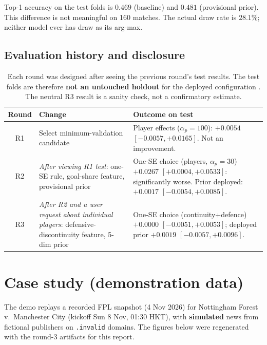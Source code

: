 \documentclass[11pt,a4paper]{article}
\newcommand{\code}[1]{\texttt{\small #1}}
\begin{document}
Top-1 accuracy on the test folds is $0.469$ (baseline) and $0.481$
(provisional prior). This difference is not meaningful on 160 matches. The
actual draw rate is $28.1\%$; neither model ever has draw as its arg-max.

\subsection{Evaluation history and disclosure}\label{sec:rounds}

\begin{table}[h]
\centering\small
\begin{tabularx}{\linewidth}{@{}c>{\raggedright\arraybackslash}p{5.6cm}>{\raggedright\arraybackslash}X@{}}
\toprule
Round & Change & Outcome on test \\
\midrule
R1 & Select minimum-validation candidate & Player effects ($\alpha_p{=}100$): $+0.0054$ $[-0.0057,+0.0165]$. Not an improvement. \\
R2 & \emph{After viewing R1 test}: one-SE rule, goal-share feature, provisional prior & One-SE choice (players, $\alpha_p{=}30$) $+0.0267$ $[+0.0004,+0.0533]$: significantly worse. Prior deployed: $+0.0017$ $[-0.0054,+0.0085]$. \\
R3 & \emph{After R2 and a user request about individual players}: defensive-discontinuity feature, 5-dim prior & One-SE choice (continuity+defence) $+0.0000$ $[-0.0051,+0.0053]$; deployed prior $+0.0019$ $[-0.0057,+0.0096]$. \\
\bottomrule
\end{tabularx}
\caption{Each round was designed after seeing the previous round's test
results. The test folds are therefore \textbf{not an untouched holdout} for the
deployed configuration \citep{cawley2010}. The neutral R3 result is a sanity
check, not a confirmatory estimate.}
\label{tab:rounds}
\end{table}

\section{Case study (demonstration data)}\label{sec:case}

The demo replays a recorded FPL snapshot (4 Nov 2026) for Nottingham Forest
v.\ Manchester City (kickoff Sun 8 Nov, 01:30 HKT), with \textbf{simulated}
news from fictional publishers on \code{.invalid} domains. The figures below
were regenerated with the round-3 artifacts for this report.
\end{document}
